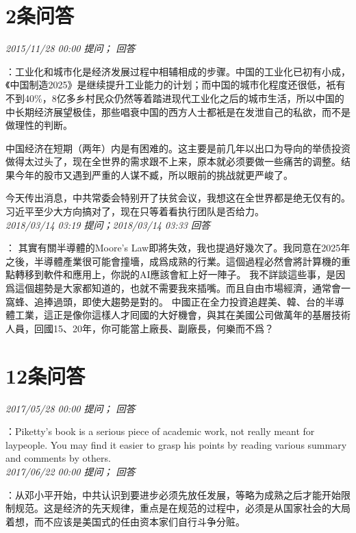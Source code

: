 \documentclass[twocolumn]{ctexart}
\begin{document}
\section{2条问答}

\textit{\hfill\noindent\small 2015/11/28 00:00 提问； 回答}

：工业化和城市化是经济发展过程中相辅相成的步骤。中国的工业化已初有小成，《中国制造2025》是继续提升工业能力的计划；而中国的城市化程度还很低，衹有不到40\%，8亿多乡村民众仍然等着踏进现代工业化之后的城市生活，所以中国的中长期经济展望极佳，那些唱衰中国的西方人士都衹是在发泄自己的私欲，而不是做理性的判断。

中国经济在短期（两年）内是有困难的。这主要是前几年以出口为导向的举债投资做得太过头了，现在全世界的需求跟不上来，原本就必须要做一些痛苦的调整。结果今年的股市又遇到严重的人谋不臧，所以眼前的挑战就更严峻了。

今天传出消息，中共常委会特别开了扶贫会议，我想这在全世界都是绝无仅有的。习近平至少大方向搞对了，现在只等着看执行团队是否给力。\\

\textit{\hfill\noindent\small 2018/03/14 03:19 提问；2018/03/14 03:33 回答}

：
其實有關半導體的Moore’s Law即將失效，我也提過好幾次了。我同意在2025年之後，半導體產業很可能會撞墻，成爲成熟的行業。這個過程必然會將計算機的重點轉移到軟件和應用上，你説的AI應該會紅上好一陣子。
我不詳談這些事，是因爲這個趨勢是大家都知道的，也就不需要我來插嘴。而且自由市場經濟，通常會一窩蜂、追捧過頭，即使大趨勢是對的。
中國正在全力投資追趕美、韓、台的半導體工業，這正是像你這樣人才囘國的大好機會，與其在美國公司做萬年的基層技術人員，回國15、20年，你可能當上廠長、副廠長，何樂而不爲？
\\

\section{12条问答}

\textit{\hfill\noindent\small 2017/05/28 00:00 提问； 回答}

：Piketty's book is a serious piece of academic work, not really meant for laypeople. You may find it easier to grasp his points by reading various summary and comments by others.\\

\textit{\hfill\noindent\small 2017/06/22 00:00 提问； 回答}

：从邓小平开始，中共认识到要进步必须先放任发展，等略为成熟之后才能开始限制规范。这是经济的先天规律，重点是在规范的过程中，必须是从国家社会的大局着想，而不应该是美国式的任由资本家们自行斗争分赃。\\
\end{document}
